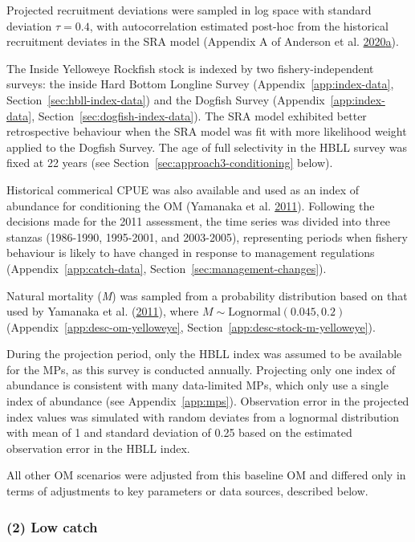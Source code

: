 \documentclass[11pt]{book}
\begin{document}
Projected recruitment deviations were sampled in log space with standard deviation \(\tau = 0.4\), with autocorrelation estimated post-hoc from the historical recruitment deviates in the SRA model (Appendix A of Anderson et al. \protect\hyperlink{ref-anderson2020gfmp}{2020}\protect\hyperlink{ref-anderson2020gfmp}{a}).

The Inside Yelloweye Rockfish stock is indexed by two fishery-independent surveys: the inside Hard Bottom Longline Survey (Appendix~\ref{app:index-data}, Section~\ref{sec:hbll-index-data}) and the Dogfish Survey (Appendix~\ref{app:index-data}, Section~\ref{sec:dogfish-index-data}). The SRA model exhibited better retrospective behaviour when the SRA model was fit with more likelihood weight applied to the Dogfish Survey. The age of full selectivity in the HBLL survey was fixed at 22 years (see Section~\ref{sec:approach3-conditioning} below).

Historical commerical CPUE was also available and used as an index of abundance for conditioning the OM (Yamanaka et al. \protect\hyperlink{ref-yamanaka2011}{2011}). Following the decisions made for the 2011 assessment, the time series was divided into three stanzas (1986-1990, 1995-2001, and 2003-2005), representing periods when fishery behaviour is likely to have changed in response to management regulations (Appendix~\ref{app:catch-data}, Section~\ref{sec:management-changes}).

Natural mortality (\emph{M}) was sampled from a probability distribution based on that used by Yamanaka et al. (\protect\hyperlink{ref-yamanaka2011}{2011}), where \(M \sim \textrm{Lognormal}(0.045, 0.2)\) (Appendix~\ref{app:desc-om-yelloweye}, Section~\ref{app:desc-stock-m-yelloweye}).

During the projection period, only the HBLL index was assumed to be available for the MPs, as this survey is conducted annually. Projecting only one index of abundance is consistent with many data-limited MPs, which only use a single index of abundance (see Appendix~\ref{app:mps}). Observation error in the projected index values was simulated with random deviates from a lognormal distribution with mean of 1 and standard deviation of 0.25 based on the estimated observation error in the HBLL index.

All other OM scenarios were adjusted from this baseline OM and differed only in terms of adjustments to key parameters or data sources, described below.

\hypertarget{sec:approach3-reference2}{%
\subsubsection{(2) Low catch}\label{sec:approach3-reference2}}
\end{document}
